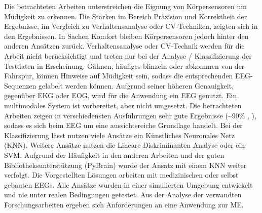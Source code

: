 Die betrachteten Arbeiten unterstreichen die Eignung von Körpersensoren  um Müdigkeit zu erkennen. Die Stärken im Bereich Präzision und Korrektheit der Ergebnisse, im Vergleich zu Verhaltensanalyse oder CV-Techniken, zeigten sich in den Ergebnissen. In Sachen Komfort bleiben  Körpersensoren jedoch hinter den anderen Ansätzen zurück. Verhaltensanalyse oder CV-Technik werden für die Arbeit nicht berücksichtigt und treten nur bei der Analyse / Klassifizierung der Testdaten in Erscheinung. Gähnen, häufiges blinzeln oder abkommen von der Fahrspur, können Hinweise auf Müdigkeit sein, sodass die entsprechenden EEG-Sequenzen gelabelt werden können. 
Aufgrund seiner höheren Genauigkeit, gegenüber EKG oder EOG, wird für die Anwendung ein EEG genutzt. Ein multimodales System ist vorbereitet, aber nicht umgesetzt. Die betrachteten Arbeiten zeigen in verschiedensten Ausführungen sehr gute Ergebnisse (\textasciitilde 90\% \cite{Lin05eeg-baseddrowsiness}, \cite{Subasi:2005:ARA:1707423.1707550}), sodass es sich beim EEG um eine aussichtsreiche Grundlage handelt. 
Bei der Klassifizierung lässt nutzen viele Ansätze ein Künstliches Neuronales Netz  (KNN)\cite{Subasi:2005:ARA:1707423.1707550}\cite{Vuckovic2002349}\cite{wilson_890161}\cite{khalifa_893852}. Weitere Ansätze nutzen die Lineare Diskriminanten Analyse\cite{Vicente_6164509}\cite{Khushaba_5580017} oder ein SVM\cite{Park:2009:DDD:1667780.1667798}\cite{zhang_6513058}. Aufgrund der Häufigkeit in den anderen Arbeiten und der guten Bibliotheksunterstützung (PyBrain) wurde der Ansatz mit einem KNN weiter verfolgt. Die Vorgestellten Lösungen arbeiten mit medizinischen oder selbst gebauten EEGs. Alle Ansätze wurden in einer simulierten Umgebung entwickelt und nie unter realen Bedingungen getestet. Aus der Analyse der verwandten Forschungsarbeiten ergeben sich Anforderungen an eine Anwendung zur \acl{ME}. 